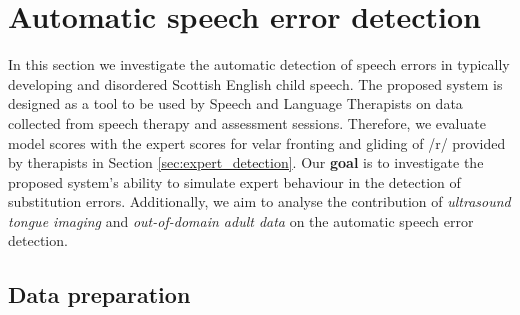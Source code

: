 \section{Automatic speech error detection}
\label{sec:automatic_detection}

In this section we investigate the automatic detection of speech errors in typically developing and disordered Scottish English child speech.
The proposed system is designed as a tool to be used by Speech and Language Therapists on data collected from speech therapy and assessment sessions.
Therefore, we evaluate model scores with the expert scores for velar fronting and gliding of /r/ provided by therapists in Section \ref{sec:expert_detection}.
Our \textbf{goal} is to investigate the proposed system's ability to simulate expert behaviour in the detection of substitution errors.
Additionally, we aim to analyse the contribution of \emph{ultrasound tongue imaging} and \emph{out-of-domain adult data} on the automatic speech error detection.

\subsection{Data preparation}

